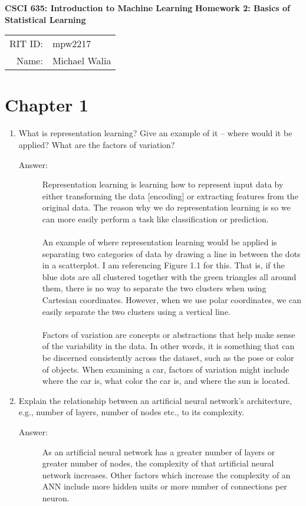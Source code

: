 \documentclass[12pt]{article}
\begin{document}
\hrulefill
\begin{center}
\textbf{{\Large CSCI 635: Introduction to Machine Learning}}
\textbf{{\Large Homework 2: Basics of Statistical Learning}}

\begin{tabular}{rl}

RIT ID: & mpw2217 \\
Name: & Michael Walia \\
\end{tabular}
\end{center}
\hrulefill
\section*{Chapter 1}

\begin{enumerate}
  \item What is representation learning? Give an example of it – where would it be
applied? What are the factors of variation?
\begin{description}
 \item[Answer:]Representation learning is learning how to represent input data by either transforming the data [encoding] or extracting features from the original data. The reason why we do representation learning is so we can more easily perform a task like classification or prediction.\\\\
An example of where representation learning would be applied is separating two categories of data by drawing a line in between the dots in a scatterplot. I am referencing Figure 1.1 for this. That is, if the blue dots are all clustered together with the green triangles all around them, there is no way to separate the two clusters when using Cartesian coordinates. However, when we use polar coordinates, we can easily separate the two clusters using a vertical line.\\\\
Factors of variation are concepts or abstractions that help make sense of the variability in the data. In other words, it is something that can be discerned consistently across the dataset, such as the pose or color of objects. When examining a car, factors of variation might include where the car is, what color the car is, and where the sun is located.
\end{description}





  \item Explain the relationship between an artificial neural network’s architecture,
e.g., number of layers, number of nodes etc., to its complexity.
\begin{description}
 \item[Answer:]As an artificial neural network has a greater number of layers or greater number of nodes, the complexity of that artificial neural network increases. Other factors which increase the complexity of an ANN include more hidden units or more number of connections per neuron.
\end{description}
\end{enumerate}
\end{document}
